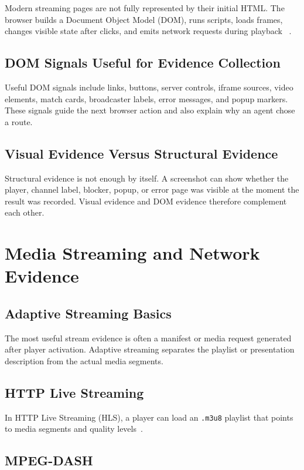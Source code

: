 Modern streaming pages are not fully represented by their initial HTML. The
browser builds a Document Object Model (DOM), runs scripts, loads frames,
changes visible state after clicks, and emits network requests during playback
~\cite{whatwg-html}.

\subsection{DOM Signals Useful for Evidence Collection}

Useful DOM signals include links, buttons, server controls, iframe sources,
video elements, match cards, broadcaster labels, error messages, and popup
markers. These signals guide the next browser action and also explain why an
agent chose a route.

\subsection{Visual Evidence Versus Structural Evidence}

Structural evidence is not enough by itself. A screenshot can show whether the
player, channel label, blocker, popup, or error page was visible at the moment
the result was recorded. Visual evidence and DOM evidence therefore complement
each other.

\section{Media Streaming and Network Evidence}

\subsection{Adaptive Streaming Basics}

The most useful stream evidence is often a manifest or media request generated
after player activation. Adaptive streaming separates the playlist or
presentation description from the actual media segments.

\subsection{HTTP Live Streaming}

In HTTP Live Streaming (HLS), a player can load an \texttt{.m3u8} playlist that
points to media segments and quality levels~\cite{hls-rfc}.

\subsection{MPEG-DASH}

